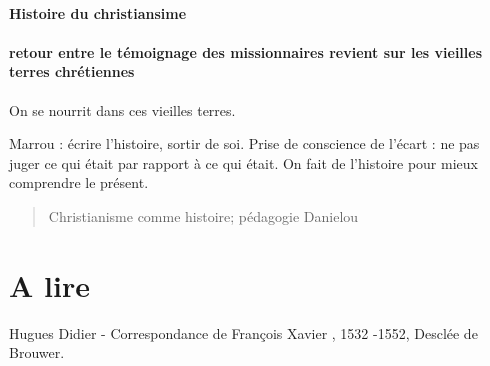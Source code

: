 \paragraph{Histoire du christiansime}

\paragraph{retour entre le témoignage des missionnaires revient sur les vieilles terres chrétiennes} On se nourrit dans ces vieilles terres.

Marrou : écrire l'histoire, sortir de soi. Prise de conscience de l'écart : ne pas juger ce qui était par rapport à ce qui était. On fait de l'histoire pour mieux comprendre le présent.
\begin{quote}
Christianisme comme histoire; pédagogie 
Danielou
\end{quote}

\section{A lire}

Hugues Didier - Correspondance de François Xavier , 1532 -1552, Desclée de Brouwer. 

